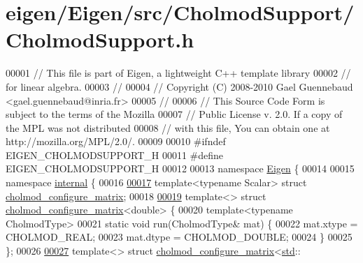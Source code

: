 \hypertarget{eigen_2_eigen_2src_2_cholmod_support_2_cholmod_support_8h_source}{}\section{eigen/\+Eigen/src/\+Cholmod\+Support/\+Cholmod\+Support.h}
\label{eigen_2_eigen_2src_2_cholmod_support_2_cholmod_support_8h_source}

\begin{DoxyCode}
00001 \textcolor{comment}{// This file is part of Eigen, a lightweight C++ template library}
00002 \textcolor{comment}{// for linear algebra.}
00003 \textcolor{comment}{//}
00004 \textcolor{comment}{// Copyright (C) 2008-2010 Gael Guennebaud <gael.guennebaud@inria.fr>}
00005 \textcolor{comment}{//}
00006 \textcolor{comment}{// This Source Code Form is subject to the terms of the Mozilla}
00007 \textcolor{comment}{// Public License v. 2.0. If a copy of the MPL was not distributed}
00008 \textcolor{comment}{// with this file, You can obtain one at http://mozilla.org/MPL/2.0/.}
00009 
00010 \textcolor{preprocessor}{#ifndef EIGEN\_CHOLMODSUPPORT\_H}
00011 \textcolor{preprocessor}{#define EIGEN\_CHOLMODSUPPORT\_H}
00012 
00013 \textcolor{keyword}{namespace }\hyperlink{namespace_eigen}{Eigen} \{ 
00014 
00015 \textcolor{keyword}{namespace }\hyperlink{namespaceinternal}{internal} \{
00016 
\hyperlink{struct_eigen_1_1internal_1_1cholmod__configure__matrix}{00017} \textcolor{keyword}{template}<\textcolor{keyword}{typename} Scalar> \textcolor{keyword}{struct }\hyperlink{struct_eigen_1_1internal_1_1cholmod__configure__matrix}{cholmod\_configure\_matrix};
00018 
\hyperlink{struct_eigen_1_1internal_1_1cholmod__configure__matrix_3_01double_01_4}{00019} \textcolor{keyword}{template}<> \textcolor{keyword}{struct }\hyperlink{struct_eigen_1_1internal_1_1cholmod__configure__matrix}{cholmod\_configure\_matrix}<double> \{
00020   \textcolor{keyword}{template}<\textcolor{keyword}{typename} CholmodType>
00021   \textcolor{keyword}{static} \textcolor{keywordtype}{void} run(CholmodType& mat) \{
00022     mat.xtype = CHOLMOD\_REAL;
00023     mat.dtype = CHOLMOD\_DOUBLE;
00024   \}
00025 \};
00026 
\hyperlink{struct_eigen_1_1internal_1_1cholmod__configure__matrix_3_01std_1_1complex_3_01double_01_4_01_4}{00027} \textcolor{keyword}{template}<> \textcolor{keyword}{struct }\hyperlink{struct_eigen_1_1internal_1_1cholmod__configure__matrix}{cholmod\_configure\_matrix}<\hyperlink{namespacestd}{std}::

\end{DoxyCode}
